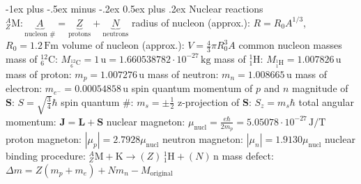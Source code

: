 \documentclass[10pt,landscape]{article}
\makeatletter
\renewcommand{\subsection}{\@startsection{subsection}{2}{0mm}%
                                {-1ex plus -.5ex minus -.2ex}%
                                {0.5ex plus .2ex}%
                                {\normalfont\normalsize\bfseries}}
\newcommand{\spc}{\hspace*{1em}}
\makeatother
\begin{document}
\begin{multicols*}{3}
\subsection{Nuclear reactions}
$^A_Z\textrm{M}: \underbrace{A}_{\textrm{nucleon \#}}=\underbrace{Z}_{\textrm{protons}}+\underbrace{N}_{\textrm{neutrons}}$
\newline
radius of nucleon (approx.): $R=R_0A^{1/3}$, $R_0=1.2\,\textrm{Fm}$
\newline
volume of nucleon (approx.): $V=\frac{4}{3}\pi R_0^3A$
\newline \newline
common nucleon masses
\newline
\spc mass of $^{12}_6\mathrm{C}$: $M_{^{12}_6\mathrm{C}}=1\,\textrm{u}=1.660538782\cdot 10^{-27}\,\textrm{kg}$
\newline
\spc mass of $^1_1\mathrm{H}$: $M_{^1_1\mathrm{H}}=1.007826\,\textrm{u}$
\newline
\spc mass of proton: $m_p=1.007276\,\textrm{u}$
\newline
\spc mass of neutron: $m_n=1.008665\,\textrm{u}$
\newline
\spc mass of electron: $m_{e^{-}}=0.00054858\,\textrm{u}$
\newline \newline
spin quantum momentum of $p$ and $n$
\newline
\spc magnitude of $\mathbf{S}$: $S=\sqrt{\tfrac{3}{4}}\hbar$
\newline
\spc spin quantum \#: $m_s=\pm\frac{1}{2}$
\newline
\spc z-projection of $\mathbf{S}$: $S_z=m_s\hbar$
\newline
total angular momentum: $\mathbf{J}=\mathbf{L}+\mathbf{S}$
\newline \newline
nuclear magneton: $\mu_{\textrm{nucl}}=\frac{e\hbar}{2m_p}=5.05078\cdot 10^{-27}\,\textrm{J}/\textrm{T}$
\newline
proton magneton: $|\mu_p|=2.7928\mu_{\textrm{nucl}}$
\newline
neutron magneton: $|\mu_n|=1.9130\mu_{\textrm{nucl}}$
\newline \newline
nuclear binding
\newline
\spc procedure: $^A_Z\textrm{M}+\textrm{K}\rightarrow (Z)\,^1_1\textrm{H}+(N)\, \textrm{n}$
\newline
\spc mass defect: $\Delta m=Z(m_p+m_e)+Nm_n-M_{\textrm{original}}$
\newline

\end{multicols*}
\end{document}
